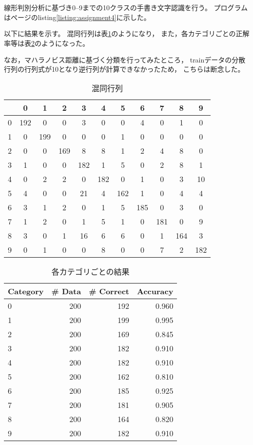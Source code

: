 \documentclass[class=jsarticle, crop=false, dvipdfmx, fleqn]{standalone}
\begin{document}
\section{}

線形判別分析に基づき0--9までの10クラスの手書き文字認識を行う。
プログラムは\pageref{listing:assignment4}ページのlisting\ref{listing:assignment4}に示した。

以下に結果を示す。
混同行列は表\ref{tab:confusion_matrix}のようになり，
また，各カテゴリごとの正解率等は表\ref{tab:result}のようになった。

なお，マハラノビス距離に基づく分類を行ってみたところ，
trainデータの分散行列の行列式が10となり逆行列が計算できなかったため，
こちらは断念した。

\begin{table}[H]
	\centering
	\caption{混同行列}
	\begin{tabular}{|c||cccccccccc|} \hline
			& 0 & 1 & 2 & 3 & 4 & 5 & 6 & 7 & 8 & 9 \\ \hline\hline
		0	& 192 & 0 & 0 & 3 & 0 & 0 & 4 & 0 & 1 & 0 \\
		1	& 0 & 199 & 0 & 0 & 0 & 1 & 0 & 0 & 0 & 0 \\
		2	& 0 & 0 & 169 & 8 & 8 & 1 & 2 & 4 & 8 & 0 \\
		3	& 1 & 0 & 0 & 182 & 1 & 5 & 0 & 2 & 8 & 1 \\
		4	& 0 & 2 & 2 & 0 & 182 & 0 & 1 & 0 & 3 & 10 \\
		5	& 4 & 0 & 0 & 21 & 4 & 162 & 1 & 0 & 4 & 4 \\
		6	& 3 & 1 & 2 & 0 & 1 & 5 & 185 & 0 & 3 & 0 \\
		7	& 1 & 2 & 0 & 1 & 5 & 1 & 0 & 181 & 0 & 9 \\
		8	& 3 & 0 & 1 & 16 & 6 & 6 & 0 & 1 & 164 & 3 \\
		9	& 0 & 1 & 0 & 0 & 8 & 0 & 0 & 7 & 2 & 182 \\
		\hline
	\end{tabular}
	\label{tab:confusion_matrix}
\end{table}

\begin{table}[H]
	\centering
	\caption{各カテゴリごとの結果}
	\begin{tabular}{lrrr}
		Category & \# Data & \# Correct & Accuracy \\ \hline
		0 & 200 & 192 & 0.960 \\
		1 & 200 & 199 & 0.995 \\
		2 & 200 & 169 & 0.845 \\
		3 & 200 & 182 & 0.910 \\
		4 & 200 & 182 & 0.910 \\
		5 & 200 & 162 & 0.810 \\
		6 & 200 & 185 & 0.925 \\
		7 & 200 & 181 & 0.905 \\
		8 & 200 & 164 & 0.820 \\
		9 & 200 & 182 & 0.910
	\end{tabular}
	\label{tab:result}
\end{table}
\end{document}
